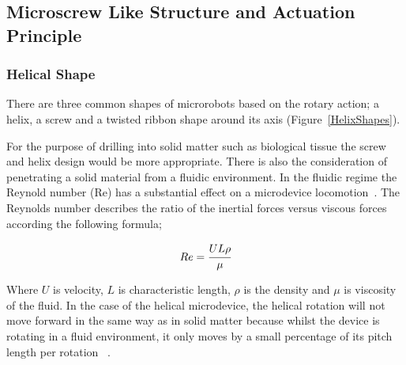 \documentclass[a4paper,11pt]{article}
\begin{document}
\begin{sloppypar}
\subsection{Microscrew Like Structure and Actuation Principle}
\paragraph{}
\subsubsection{Helical Shape}

 There are three common shapes of microrobots 
based on the rotary action; a helix, a screw and a twisted ribbon shape around its axis (Figure~\ref{HelixShapes}). 


For the purpose of drilling into solid matter such as biological tissue the screw and helix 
design would be more appropriate. There is also the consideration of penetrating a solid 
material from a fluidic environment. In the fluidic regime the Reynold number (Re) has a substantial effect on a microdevice
locomotion~\citep{peyer2013magnetic}. The Reynolds number describes the ratio of the inertial forces versus viscous 
forces according the following formula;

\begin{equation}
  Re = \cfrac{UL\rho}{\mu}
\label{eq:4}
\end{equation}
 
Where $ U$ is velocity, $L$ is characteristic length, $\rho$ is the density and $\mu$ is viscosity of the fluid.
 In the case of the helical microdevice, the helical rotation will not move 
forward in the same way as in solid matter because whilst the device is rotating in a fluid environment, 
it only moves by a small percentage of its pitch length per rotation ~\citep{peyer2013magnetic}. 


\end{sloppypar}
\end{document}
